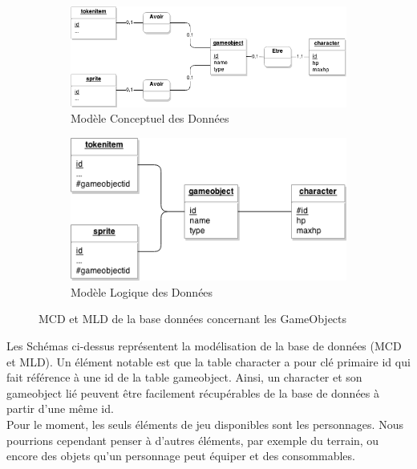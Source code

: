 \begin{figure}[h!]
        \centering
        \begin{subfigure}[h!]{0.7\textwidth}
                \includegraphics[width=\textwidth]{img/gameobject_MCD.png}
                \caption{Modèle Conceptuel des Données}
        \end{subfigure}

        \begin{subfigure}[h!]{0.5\textwidth}
                \includegraphics[width=\textwidth]{img/gameobject_MLD.png}
                \caption{Modèle Logique des Données}
        \end{subfigure}
        \caption{MCD et MLD de la base données concernant les GameObjects}
        \label{fig:GameObjectsBDD}
\end{figure}

\newpage

Les Schémas ci-dessus représentent la modélisation de la base de données (MCD et MLD). Un élément notable est que la table character a pour clé primaire id qui fait référence à une id de la table gameobject. Ainsi, un character et son gameobject lié peuvent être facilement récupérables de la base de données à partir d'une même id.\\

Pour le moment, les seuls éléments de jeu disponibles sont les personnages. Nous pourrions cependant penser à d'autres éléments, par exemple du terrain, ou encore des objets qu'un personnage peut équiper et des consommables.\\